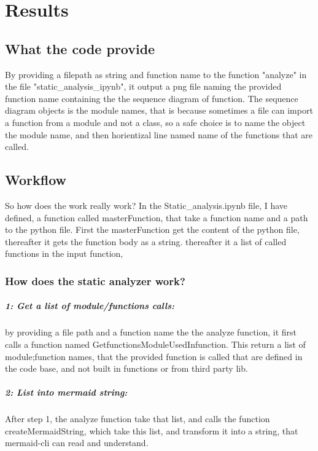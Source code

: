 \documentclass[12pt,a4paper]{report}
\begin{document}
    \chapter{Results}

    \section{What the code provide}
    By providing a filepath as string and function name to the function "analyze" in the file "static\_analysis\_ipynb", it output a png file naming the provided function name containing the the sequence diagram of function. The sequence diagram objects is the module names, that is because sometimes a file can import a function from a module and not a class, so a safe choice is to name the object the module name, and then horientizal line named name of the functions that are called. 
   
   
    \section{Workflow}
     So how does the work really work? 
    In the Static\_analysis.ipynb file, I have defined, a function called masterFunction, that take a function name and a path to the python file. First the masterFunction get the content of the python file, thereafter it gets the function body as a string. thereafter it a list of called functions in the input function,
    
    \subsection*{How does the static analyzer work?}
    
    \paragraph*{1: Get a list of module/functions calls:}
    by providing a file path and a function name the the analyze function, it first calls a function named GetfunctionsModuleUsedInfunction. 
    This return a list of module;function names, that the provided function is called that are defined in the code base, and not built in functions or from third party lib. 
    
    \paragraph{2: List into mermaid string:}
    After step 1, the analyze function take that list, and calls the function createMermaidString, which take this list, and transform it into a string, that mermaid-cli can read and understand. 
\end{document}
